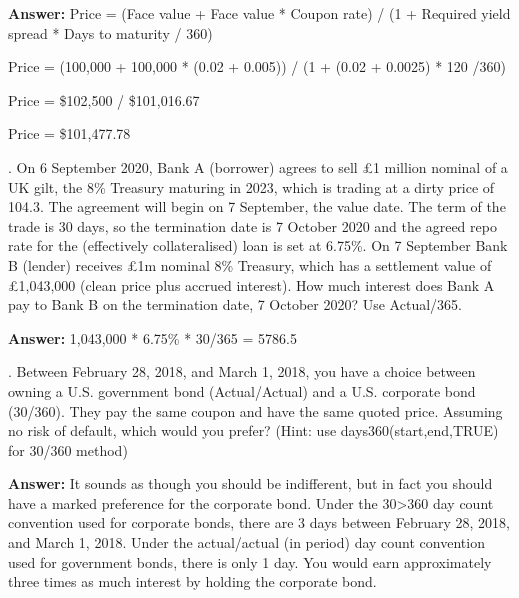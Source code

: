 \documentclass[11.5pt]{article}
\begin{document}
\vspace{20pt}
\textbf{Answer:}
Price = (Face value + Face value * Coupon rate) / (1 + Required yield spread * Days to maturity / 360)

Price = (100,000 + 100,000 * (0.02 + 0.005)) / (1 + (0.02 + 0.0025) * 120 /360)

Price = \$102,500 / \$101,016.67

Price = \$101,477.78


\newpage



. On 6 September 2020, Bank A (borrower) agrees to sell £1 million nominal of a UK gilt, the 8\% Treasury maturing in 2023, which is trading at a dirty price of 104.3. The agreement will begin on 7 September, the value date. The term of the trade is 30 days, so the termination date is 7 October 2020 and the agreed repo rate for the (effectively collateralised) loan is set at 6.75\%. On 7 September Bank B (lender) receives £1m nominal 8\% Treasury, which has a settlement value of £1,043,000 (clean price plus accrued interest). How much interest does Bank A pay to Bank B on the termination date, 7 October 2020? Use Actual/365.

\vspace{20pt}
\textbf{Answer:}
 1,043,000 * 6.75\% * 30/365 = 5786.5



\vspace{60pt}



. Between February 28, 2018, and March 1, 2018, you have a choice between owning a U.S. government bond (Actual/Actual) and a U.S. corporate bond (30/360). They pay the same coupon and have the same quoted price. Assuming no risk of default, which would you prefer? (Hint: use days360(start,end,TRUE) for 30/360 method)

\vspace{20pt}
\textbf{Answer:}
It sounds as though you should be indifferent, but in fact you should have a marked preference for the corporate bond. Under the 30>360 day count convention used for corporate bonds, there are 3 days between February 28, 2018, and March 1, 2018. Under the actual/actual (in period) day count convention used for government bonds, there is only 1 day. You would earn approximately three times as much interest by holding the corporate bond.
\end{document}
